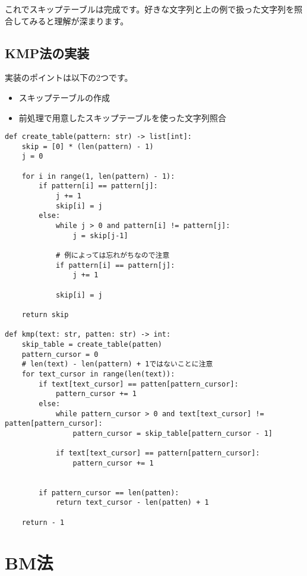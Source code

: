 \documentclass{jlreq}
\begin{document}
\vspace{0.5cm}
これでスキップテーブルは完成です。好きな文字列と上の例で扱った文字列を照合してみると理解が深まります。

\subsection{KMP法の実装}

実装のポイントは以下の2つです。

\begin{itemize}
    \item スキップテーブルの作成
    \item 前処理で用意したスキップテーブルを使った文字列照合
\end{itemize}

\begin{lstlisting}[caption=KMP法の実装, frame=TRBL, label={KMP}]
def create_table(pattern: str) -> list[int]:
    skip = [0] * (len(pattern) - 1)
    j = 0

    for i in range(1, len(pattern) - 1):
        if pattern[i] == pattern[j]:
            j += 1
            skip[i] = j
        else:
            while j > 0 and pattern[i] != pattern[j]:
                j = skip[j-1]
            
            # 例によっては忘れがちなので注意
            if pattern[i] == pattern[j]:
                j += 1
            
            skip[i] = j
    
    return skip

def kmp(text: str, patten: str) -> int:
    skip_table = create_table(patten)
    pattern_cursor = 0
    # len(text) - len(pattern) + 1ではないことに注意
    for text_cursor in range(len(text)):
        if text[text_cursor] == patten[pattern_cursor]:
            pattern_cursor += 1
        else:
            while pattern_cursor > 0 and text[text_cursor] != patten[pattern_cursor]:
                pattern_cursor = skip_table[pattern_cursor - 1]
            
            if text[text_cursor] == pattern[pattern_cursor]:
                pattern_cursor += 1
                
        
        if pattern_cursor == len(patten):
            return text_cursor - len(patten) + 1
        
    return - 1
\end{lstlisting}

\newpage

\section{BM法}
\end{document}
